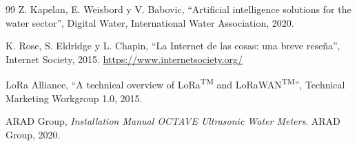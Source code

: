 \documentclass[12pt,letterpaper]{article}
\begin{document}
\begin{thebibliography}{99}
Z. Kapelan, E. Weisbord y V. Babovic, ``Artificial intelligence solutions for the water sector'', Digital Water, International Water Association, 2020.

K. Rose, S. Eldridge y L. Chapin, ``La Internet de las cosas: una breve reseña'', Internet Society, 2015. \url{https://www.internetsociety.org/}

LoRa Alliance, ``A technical overview of LoRa\textsuperscript{TM} and LoRaWAN\textsuperscript{TM}'', Technical Marketing Workgroup 1.0, 2015.

ARAD Group, \emph{Installation Manual OCTAVE Ultrasonic Water Meters}. ARAD Group, 2020.

\end{thebibliography}
\end{document}
